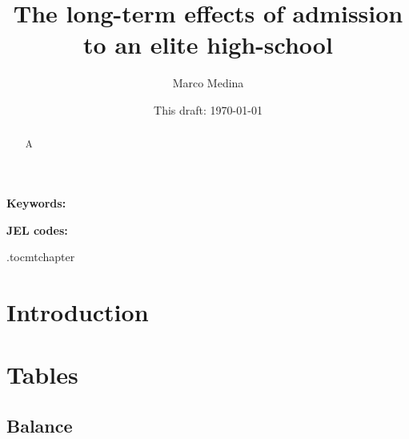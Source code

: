 \documentclass[oneside,11pt]{article}
\begin{document}
\title{The long-term effects of admission to an elite high-school}
\author{Marco Medina}
\date{This draft:  \today \\[2 cm]}



\maketitle
\thispagestyle{empty}
\begin{abstract}
A
\end{abstract}

\vspace{.3in}

\textbf{Keywords: }

\textbf{JEL codes:}

\newpage

\etocdepthtag.toc{mtchapter}



\section{Introduction}


\newpage



\clearpage

%
%
%



\clearpage
\singlespacing

\section{Tables}

\subsection{Balance}
\end{document}
